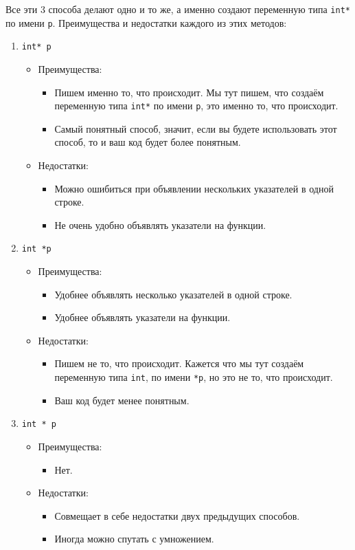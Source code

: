 \documentclass{article}
\begin{document}
Все эти 3 способа делают одно и то же, а именно создают переменную типа \texttt{int*} по имени \texttt{p}. Преимущества и недостатки каждого из этих методов:
\begin{enumerate}
\item \texttt{int* p}
\begin{itemize}
\item Преимущества:
\begin{itemize}
\item Пишем именно то, что происходит. Мы тут пишем, что создаём переменную типа  \texttt{int*}  по имени \texttt{p}, это именно то, что происходит.
\item Самый понятный способ, значит, если вы будете использовать этот способ, то и ваш код будет более понятным.
\end{itemize}

\item Недостатки:
\begin{itemize}
\item Можно ошибиться при объявлении нескольких указателей в одной строке.
\item Не очень удобно объявлять указатели на функции.
\end{itemize}
\end{itemize}


\item \texttt{int *p}
\begin{itemize}
\item Преимущества:
\begin{itemize}
\item Удобнее объявлять несколько указателей в одной строке.
\item Удобнее объявлять указатели на функции.
\end{itemize}

\item Недостатки:
\begin{itemize}
\item Пишем не то, что происходит. Кажется что мы тут создаём переменную типа \texttt{int}, по имени \texttt{*p}, но это не то, что происходит.
\item Ваш код будет менее понятным.
\end{itemize}
\end{itemize}


\item \texttt{int * p}
\begin{itemize}
\item Преимущества:
\begin{itemize}
\item Нет.
\end{itemize}

\item Недостатки:
\begin{itemize}
\item Совмещает в себе недостатки двух предыдущих способов.
\item Иногда можно спутать с умножением.
\end{itemize}
\end{itemize}

\end{enumerate}
\end{document}

